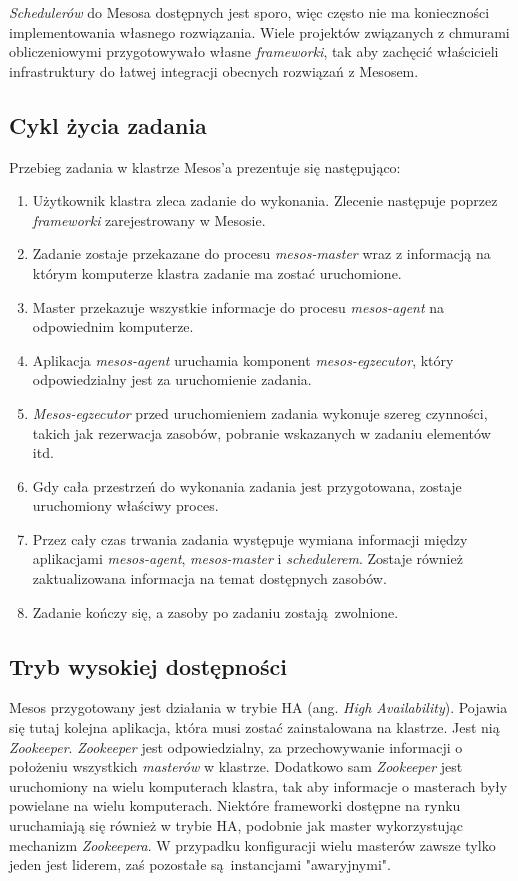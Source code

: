 \documentclass[10pt,a4paper,titlepage,twoside]{report}
\begin{document}
\textit{Schedulerów} do Mesosa dostępnych jest sporo, więc często nie ma konieczności implementowania własnego rozwiązania. Wiele projektów związanych z chmurami obliczeniowymi przygotowywało własne \textit{frameworki}, tak aby zachęcić właścicieli infrastruktury do łatwej integracji obecnych rozwiązań z Mesosem.

\subsection{Cykl życia zadania}

Przebieg zadania w klastrze Mesos'a prezentuje się następująco:
\begin{enumerate}
\item Użytkownik klastra zleca zadanie do wykonania. Zlecenie następuje poprzez \textit{frameworki} zarejestrowany w Mesosie. 
\item Zadanie zostaje przekazane do procesu \textit{mesos-master} wraz z informacją na którym komputerze klastra zadanie ma zostać uruchomione.
\item Master przekazuje wszystkie informacje do procesu \textit{mesos-agent} na odpowiednim komputerze.
\item Aplikacja \textit{mesos-agent} uruchamia komponent \textit{mesos-egzecutor}, który odpowiedzialny jest za uruchomienie zadania. 
\item \textit{Mesos-egzecutor} przed uruchomieniem zadania wykonuje szereg czynności, takich jak rezerwacja zasobów, pobranie wskazanych w zadaniu elementów itd.
\item Gdy cała przestrzeń do wykonania zadania jest przygotowana, zostaje uruchomiony właściwy proces. 
\item Przez cały czas trwania zadania występuje wymiana informacji między aplikacjami \textit{mesos-agent}, \textit{mesos-master} i \textit{schedulerem}. Zostaje również zaktualizowana informacja na temat dostępnych zasobów.
\item Zadanie kończy się, a zasoby po zadaniu zostają zwolnione.
\end{enumerate}

\subsection{Tryb wysokiej dostępności}
Mesos przygotowany jest działania w trybie HA (ang. \textit{High Availability}). Pojawia się tutaj kolejna aplikacja, która musi zostać zainstalowana na klastrze. Jest nią \textit{Zookeeper}. \textit{Zookeeper} jest odpowiedzialny, za przechowywanie informacji o położeniu wszystkich \textit{masterów} w klastrze. Dodatkowo sam \textit{Zookeeper} jest uruchomiony na wielu komputerach klastra, tak aby informacje o masterach były powielane na wielu komputerach. Niektóre frameworki dostępne na rynku uruchamiają się również w trybie HA, podobnie jak master wykorzystując mechanizm \textit{Zookeepera}. W przypadku konfiguracji wielu masterów zawsze tylko jeden jest liderem, zaś pozostałe są instancjami "awaryjnymi". 
\end{document}
